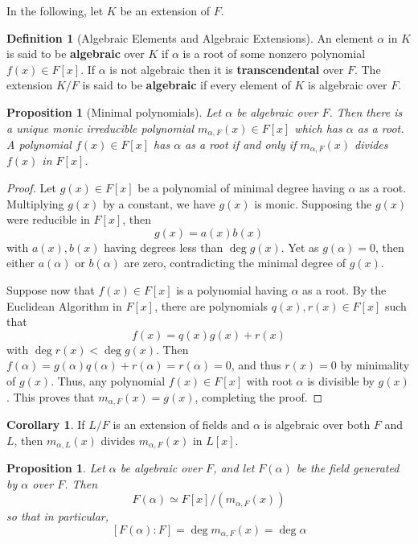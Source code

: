 \documentclass[10pt, oneside, reqno]{amsart}
\theoremstyle{plain}%
\newtheorem{prop}[thm]{Proposition}
\theoremstyle{definition}
\newtheorem{defn}[thm]{Definition}
\newtheorem{cor}[thm]{Corollary}
\theoremstyle{remark}
\newcommand{\al}{\alpha}
\newcommand{\xdeg}[2]{[#1 : #2]}
\newcommand{\minpoly}[2]{m_{#1, #2}(x)}
\begin{document}
In the following, let $K$ be an extension of $F$.
\begin{defn}[Algebraic Elements and Algebraic Extensions]
	An element $\alpha$ in $K$ is said to be \textbf{algebraic} over $K$ if $\alpha$ is a root of some nonzero polynomial $f(x) \in F[x]$.  If $\alpha$ is not algebraic then it is \textbf{transcendental} over $F$.  The extension $K/F$ is said to be \textbf{algebraic} if every element of $K$ is algebraic over $F$.
\end{defn}

\begin{prop}[Minimal polynomials]
	Let $\alpha$ be algebraic over $F$.  Then there is a unique monic irreducible polynomial $\minpoly{\alpha}{F} \in F[x]$ which has $\alpha$ as a root. A polynomial $f(x) \in F[x]$ has $\al$ as a root if and only if $\minpoly{\al}{F}$ divides $f(x)$ in $F[x]$.
\end{prop}
\begin{proof}
	Let $g(x) \in F[x]$ be a polynomial of minimal degree having $\alpha$ as a root.  Multiplying $g(x)$ by a constant, we have $g(x)$ is monic.  Supposing the $g(x)$ were reducible in $F[x]$, then \[
		g(x) = a(x)b(x)
	\] with $a(x), b(x)$ having degrees less than $\deg g(x)$.  Yet as $g(\alpha) = 0$, then either $a(\al)$ or $b(\al)$ are zero, contradicting the minimal degree of $g(x)$.
	
	Suppose now that $f(x) \in F[x]$ is a polynomial having $\al$ as a root.  By the Euclidean Algorithm in $F[x]$, there are polynomials $q(x), r(x) \in F[x]$ such that \[
		f(x) = q(x) g(x) + r(x)
	\] with $\deg r(x) < \deg g(x)$.  Then $f(\al) = g(\al) q(\al) + r(\al) = r(\al) = 0$, and thus $r(x) = 0$ by minimality of $g(x)$.  Thus, any polynomial $f(x) \in F[x]$ with root $\al$ is divisible by $g(x)$.  
	This proves that $\minpoly{\alpha}{F} = g(x)$, completing the proof.
\end{proof}

\begin{cor}
	If $L/F$ is an extension of fields and $\al$ is algebraic over both $F$ and $L$, then $\minpoly{\al}{L}$ divides $\minpoly{\al}{F}$ in $L[x]$.
\end{cor}

\begin{prop}
	Let $\al$ be algebraic over $F$, and let $F(\al)$ be the field generated by $\al$ over $F$. Then\[
		F(\al) \simeq F[x]/(\minpoly{\al}{F})
	\]
	so that in particular,\[
		\xdeg{F(\al)}{F} = \deg \minpoly{\al}{F} = \deg \al
	\]
\end{prop}
\end{document}

